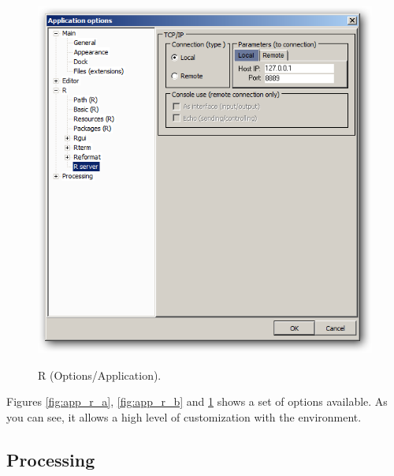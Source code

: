 \begin{figure}[h!]
  \includegraphics[scale=0.33]{./res/app_r_server.png}\\
  \caption{R (Options/Application).}
  \label{fig:app_r_c}
\end{figure}

Figures \ref{fig:app_r_a}, \ref{fig:app_r_b} and \ref{fig:app_r_c}
shows a set of options available. As you can see, it allows a high level
of customization with the \RR{} environment.


\hypertarget{working_app_processing}{}
\subsection{Processing}

